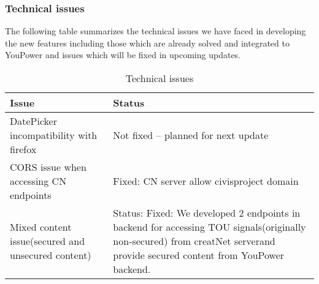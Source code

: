 \subsubsection{Technical issues}
 The following table summarizes the technical issues we have faced in developing the new features including those which are already solved and integrated to YouPower and issues which will be fixed in upcoming updates.  
\begin{table}[h!]
\caption{Technical issues}\label{tab:app_nav}
\begin{center} \footnotesize 
\begin{tabular}{ l p{6cm}}
\hline
\textbf{Issue}  &
\textbf{Status}  \\ \hline

DatePicker incompatibility with firefox
  & 
Not fixed -- planned for next update\\ 
CORS issue when accessing CN endpoints & Fixed: CN server allow civisproject domain \\ 
Mixed content issue(secured and unsecured content) & Status: Fixed: We developed 2 endpoints in backend for accessing TOU signals(originally non-secured) from creatNet serverand provide secured content from YouPower backend.\\
 \hline
\end{tabular}
\end{center} 
\end{table}